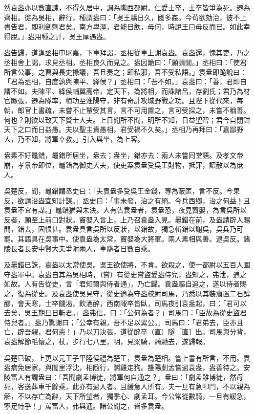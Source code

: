\begin{pinyinscope}
然袁盎亦以數直諫，不得久居中，調為隴西都尉。仁愛士卒，士卒皆爭為死。遷為齊相。徙為吳相，辭行，種謂盎曰：「吳王驕日久，國多姦。今茍欲劾治，彼不上書告君，即利劍刺君矣。南方卑溼，君能日飲，毋何，時說王曰毋反而已。如此幸得脫。」盎用種之計，吳王厚遇盎。

盎告歸，道逢丞相申屠嘉，下車拜謁，丞相從車上謝袁盎。袁盎還，愧其吏，乃之丞相舍上謁，求見丞相。丞相良久而見之。盎因跪曰：「願請閒。」丞相曰：「使君所言公事，之曹與長史掾議，吾且奏之；即私邪，吾不受私語。」袁盎即跪說曰：「君為丞相，自度孰與陳平、絳侯？」丞相曰：「吾不如。」袁盎曰：「善，君即自謂不如。夫陳平、絳侯輔翼高帝，定天下，為將相，而誅諸呂，存劉氏；君乃為材官蹶張，遷為隊率，積功至淮陽守，非有奇計攻城野戰之功。且陛下從代來，每朝，郎官上書疏，未嘗不止輦受其言，言不可用置之，言可受採之，未嘗不稱善。何也？則欲以致天下賢士大夫。上日聞所不聞，明所不知，日益聖智；君今自閉鉗天下之口而日益愚。夫以聖主責愚相，君受禍不久矣。」丞相乃再拜曰：「嘉鄙野人，乃不知，將軍幸教。」引入與坐，為上客。

盎素不好鼂錯，鼂錯所居坐，盎去；盎坐，錯亦去：兩人未嘗同堂語。及孝文帝崩，孝景帝即位，鼂錯為御史大夫，使吏案袁盎受吳王財物，抵罪，詔赦以為庶人。

吳楚反，聞，鼂錯謂丞史曰：「夫袁盎多受吳王金錢，專為蔽匿，言不反。今果反，欲請治盎宜知計謀。」丞史曰：「事未發，治之有絕。今兵西鄉，治之何益！且袁盎不宜有謀。」鼂錯猶與未決。人有告袁盎者，袁盎恐，夜見竇嬰，為言吳所以反者，願至上前口對狀。竇嬰入言上，上乃召袁盎入見。鼂錯在前，及盎請辟人賜閒，錯去，固恨甚。袁盎具言吳所以反狀，以錯故，獨急斬錯以謝吳，吳兵乃可罷。其語具在吳事中。使袁盎為太常，竇嬰為大將軍。兩人素相與善。逮吳反。諸陵長者長安中賢大夫爭附兩人，車隨者日數百乘。

及鼂錯已誅，袁盎以太常使吳。吳王欲使將，不肯。欲殺之，使一都尉以五百人圍守盎軍中。袁盎自其為吳相時，（嘗）有從史嘗盜愛盎侍兒，盎知之，弗泄，遇之如故。人有告從史，言「君知爾與侍者通」，乃亡歸。袁盎驅自追之，遂以侍者賜之，復為從史。及袁盎使吳見守，從史適為守盎校尉司馬，乃悉以其裝齎置二石醇醪，會天寒，士卒饑渴，飲酒醉，西南陬卒皆臥，司馬夜引袁盎起，曰：「君可以去矣，吳王期旦日斬君。」盎弗信，曰：「公何為者？」司馬曰：「臣故為從史盜君侍兒者。」盎乃驚謝曰；「公幸有親，吾不足以累公。」司馬曰：「君弟去，臣亦且亡，辟吾親，君何患！」乃以刀決張，道從醉卒（直）隧［直］出。司馬與分背，袁盎解節毛懷之，杖，步行七八里，明，見梁騎，騎馳去，遂歸報。

吳楚已破，上更以元王子平陸侯禮為楚王，袁盎為楚相。嘗上書有所言，不用。袁盎病免居家，與閭里浮沈，相隨行，鬬雞走狗。雒陽劇孟嘗過袁盎，盎善待之。安陵富人有謂盎曰：「吾聞劇孟博徒，將軍何自通之？」盎曰：「劇孟雖博徒，然母死，客送葬車千餘乘，此亦有過人者。且緩急人所有。夫一旦有急叩門，不以親為解，不以存亡為辭，天下所望者，獨季心、劇孟耳。今公常從數騎，一旦有緩急，寧足恃乎！」罵富人，弗與通。諸公聞之，皆多袁盎。


\end{pinyinscope}
